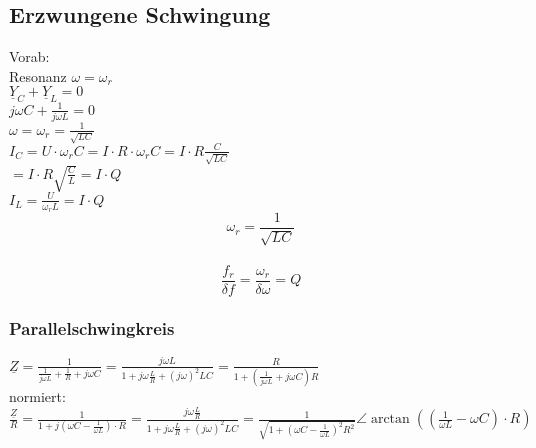 \subsection{Erzwungene Schwingung}
Vorab:\\ %
Resonanz $\omega=\omega_r$\\
$\underline{Y}_C +\underline{Y}_L = 0$\\
$j\omega C+\frac{1}{j\omega L} = 0$\\
$\omega=\omega_r=\frac{1}{\sqrt{LC}}$\\
$I_C=U\cdot\omega_rC=I\cdot R \cdot \omega_rC=I\cdot R \frac{C}{\sqrt{LC}}$\\
$=I\cdot R \sqrt{\frac{C}{L}} = I \cdot Q$\\
$I_L=\frac{U}{\omega_rL}=I \cdot Q$\\

$$\omega_r=\frac{1}{\sqrt{LC}}$$\\
$$\frac{f_r}{\delta f}=\frac{\omega_r}{\delta \omega} = Q$$

\subsubsection{Parallelschwingkreis}
$\underline{Z} = \frac{1}{\frac{1}{j\omega L}+\frac{1}{R} + j \omega C}
= \frac{j\omega L}{1+j\omega \frac{L}{R}+(j\omega)^2LC}
= \frac{R}{1+(\frac{1}{j\omega L}+j\omega C)R}$\\
normiert:\\
$\frac{\underline{Z}}{R}=\frac{1}{1+j(\omega C-\frac{1}{\omega L})\cdot R}
=\frac{j\omega \frac{L}{R}}{1+j\omega\frac{L}{R}+(j\omega)^2LC}
=\frac{1}{\sqrt{1+(\omega C - \frac{1}{\omega
L})^2R^2}} \angle \arctan{((\frac{1}{\omega L}-\omega C)\cdot R)} $\\

